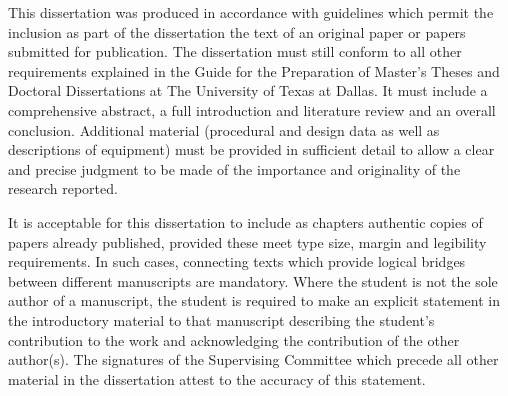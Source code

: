 This dissertation was produced in accordance with guidelines which permit the inclusion
as part of the dissertation the text of an original paper or papers submitted for
publication. The dissertation must still conform to all other requirements explained
in the Guide for the Preparation of Master's Theses and Doctoral Dissertations at
The University of Texas at Dallas. It must include a comprehensive abstract, a full
introduction and literature review and an overall conclusion. Additional material
(procedural and design data as well as descriptions of equipment) must be provided
in sufficient detail to allow a clear and precise judgment to be made of the importance
and originality of the research reported.

It is acceptable for this dissertation to include as chapters authentic copies of papers
already published, provided these meet type size, margin and legibility requirements.
In such cases, connecting texts which provide logical bridges between different
manuscripts are mandatory. Where the student is not the sole author of a manuscript,
the student is required to make an explicit statement in the introductory material to
that manuscript describing the student's contribution to the work and acknowledging
the contribution of the other author(s). The signatures of the Supervising Committee
which precede all other material in the dissertation attest to the accuracy of this
statement.
